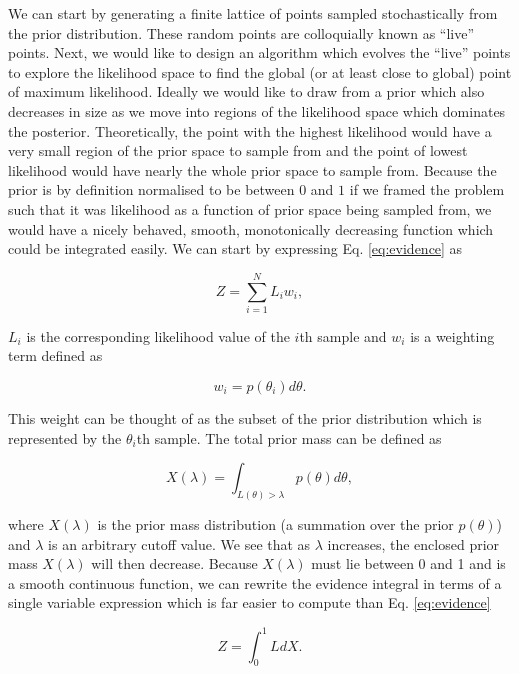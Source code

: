 We can start by generating a finite lattice of points sampled stochastically from the prior distribution. These random points are colloquially known as ``live'' points. Next, we would like to design an algorithm which evolves the ``live'' points to explore the likelihood space to find the global (or at least close to global) point of maximum likelihood. Ideally we would like to draw from a prior which also decreases in size as we move into regions of the likelihood space which dominates the posterior. Theoretically, the point with the highest likelihood would have a very small region of the prior space to sample from and the point of lowest likelihood would have nearly the whole prior space to sample from. Because the prior is by definition normalised to be between $0$ and $1$ if we framed the problem such that it was likelihood as a function of prior space being sampled from, we would have a nicely behaved, smooth, monotonically decreasing function which could be integrated easily. We can start by expressing Eq. \ref{eq:evidence} as 

\begin{equation}
    Z = \sum_{i=1}^{N} L_i w_i,
\end{equation}

$L_i$ is the corresponding likelihood value of the $i$th sample and $w_i$ is a weighting term defined as

\begin{equation}
    w_i = p(\theta_i) d\theta.
\end{equation}

This weight can be thought of as the subset of the prior distribution which is represented by the $\theta_i$th sample. The total prior mass can be defined as

\begin{equation}
    X(\lambda) = \int_{L(\theta) > \lambda} p(\theta) d\theta,
\end{equation}

where $X(\lambda)$ is the prior mass distribution (a summation over the prior $p(\theta)$) and $\lambda$ is an arbitrary cutoff value. We see that as $\lambda$ increases, the enclosed prior mass $X(\lambda)$ will then decrease. Because $X(\lambda)$ must lie between 0 and 1 and is a smooth continuous function, we can rewrite the evidence integral in terms of a single variable expression which is far easier to compute than Eq. \ref{eq:evidence}

\begin{equation}
    Z = \int_{0}^{1} L dX. \label{eq:simple_evidence}
\end{equation}

